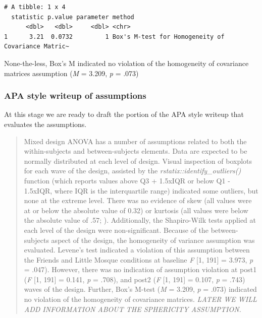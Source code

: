 \documentclass[
  11pt,
]{book}
\begin{document}
\begin{verbatim}
# A tibble: 1 x 4
  statistic p.value parameter method                                            
      <dbl>   <dbl>     <dbl> <chr>                                             
1      3.21  0.0732         1 Box's M-test for Homogeneity of Covariance Matric~
\end{verbatim}

None-the-less, Box's M indicated no violation of the homogeneity of covariance matrices assumption (\emph{M} = 3.209, \emph{p} = .073)

\hypertarget{apa-style-writeup-of-assumptions}{%
\subsubsection{APA style writeup of assumptions}\label{apa-style-writeup-of-assumptions}}

At this stage we are ready to draft the portion of the APA style writeup that evaluates the assumptions.

\begin{quote}
Mixed design ANOVA has a number of assumptions related to both the within-subjects and between-subjects elements. Data are expected to be normally distributed at each level of design. Visual inspection of boxplots for each wave of the design, assisted by the \emph{rstatix::identify\_outliers()} function (which reports values above Q3 + 1.5xIQR or below Q1 - 1.5xIQR, where IQR is the interquartile range) indicated some outliers, but none at the extreme level. There was no evidence of skew (all values were at or below the absolute value of 0.32) or kurtosis (all values were below the absolute value of .57; \citep{kline_principles_2016}). Additionally, the Shapiro-Wilk tests applied at each level of the design were non-significant. Because of the between-subjects aspect of the design, the homogeneity of variance assumption was evaluated. Levene's test indicated a violation of this assumption between the Friends and Little Mosque conditions at baseline \emph{F} {[}1, 191{]} = 3.973, \emph{p} = .047). However, there was no indication of assumption violation at post1 (\emph{F} {[}1, 191{]} = 0.141, \emph{p} = .708), and post2 (\emph{F} {[}1, 191{]} = 0.107, \emph{p} = .743) waves of the design. Further, Box's M-test (\emph{M} = 3.209, \emph{p} = .073) indicated no violation of the homogeneity of covariance matrices. \emph{LATER WE WILL ADD INFORMATION ABOUT THE SPHERICITY ASSUMPTION.}
\end{quote}
\end{document}
